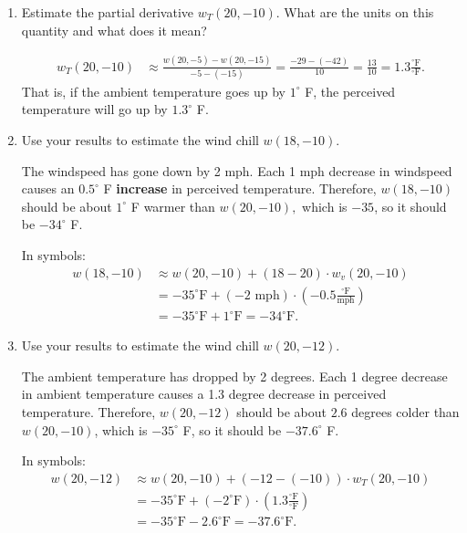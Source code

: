 \begin{enumerate}[leftmargin=0pt]
\begin{enumerate}
    \item Estimate the partial derivative $w_T(20,-10)$. What are the units on this quantity and what does it mean?
    \begin{red}
    \begin{align*}
        w_T(20,-10) &\approx 
        \frac{w(20, -5) - w(20,-15)}{-5 - (-15)} = 
        \frac{-29-(-42)}{10} = \frac{13}{10} = 1.3 \frac{^\circ \textrm{F}}{^\circ\textrm{F}}.
    \end{align*}
    That is, if the ambient temperature goes up by $1^\circ$ F, the perceived temperature will go up by $1.3^\circ$ F.
    \end{red}
    
    \item Use your results to estimate the wind chill $w(18, -10)$.
    
    \begin{red}
    The windspeed has gone down by 2 mph. Each 1 mph decrease in windspeed causes an $0.5^\circ$ F \textbf{increase} in perceived temperature. Therefore, $w(18, -10)$ should be about $1^\circ$ F warmer than $w(20, -10),$ which is $-35$, so it should be $-34^\circ$ F.
    
    In symbols: 
    \begin{align*}
        w(18, -10) &\approx w(20, -10) + (18-20) \cdot w_v(20, -10) \\
        &= -35^\circ \textrm{F} + (-2\textrm{ mph})\cdot \left(-0.5 \frac{^\circ \textrm{F}}{\textrm{mph}}\right) \\
        &= -35^\circ \textrm{F} + 1^\circ \textrm{F} = -34^\circ \textrm{F}.
    \end{align*}
    \end{red}
    
    \item Use your results to estimate the wind chill $w(20, -12)$.
    
    \begin{red}
    The ambient temperature has dropped by 2 degrees. Each 1 degree decrease in ambient temperature causes a 1.3 degree decrease in perceived temperature. Therefore, $w(20, -12)$ should be about $2.6$ degrees colder than $w(20, -10)$, which is $-35^\circ$ F, so it should be $-37.6^\circ$ F.
    
    In symbols: 
    \begin{align*}
        w(20, -12) &\approx w(20, -10) + (-12-(-10)) \cdot w_T(20, -10) \\
        &= -35^\circ \textrm{F} + (-2^\circ\textrm{F})\cdot \left(1.3 \frac{^\circ \textrm{F}}{^\circ \textrm{F}}\right) \\
        &= -35^\circ \textrm{F} -2.6^\circ \textrm{F} = -37.6^\circ \textrm{F}.
    \end{align*}
    \end{red}
    

\end{enumerate}
\end{enumerate}

